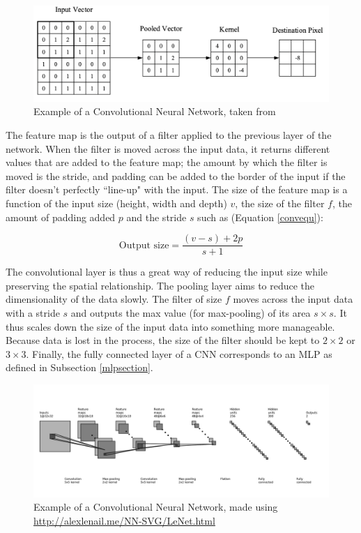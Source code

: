 \begin{figure}[H]
\centering
\includegraphics[scale=0.3]{Figures/conv2D.png}
\caption{Example of a Convolutional Neural Network, taken from \cite{cnnintro}}
\label{conv2D}
\end{figure}


The feature map is the output of a filter applied to the previous layer of the network. When the filter is moved across the input data, it returns different values that are added to the feature map; the amount by which the filter is moved is the stride, and padding can be added to the border of the input if the filter doesn't perfectly ``line-up" with the input. The size of the feature map is a function of the input size (height, width and depth) $v$, the size of the filter $f$, the amount of padding added $p$ and the stride $s$ such as (Equation \ref{convequ}):

\begin{equation}
\label{convequ}
	\text{Output size} = \frac{(v-s)+2p}{s+1}
\end{equation}

The convolutional layer is thus a great way of reducing the input size while preserving the spatial relationship. \newline
The pooling layer aims to reduce the dimensionality of the data slowly. The filter of size $f$ moves across the input data with a stride $s$ and outputs the max value (for max-pooling) of its area $s \times s$. It thus scales down the size of the input data into something more manageable. Because data is lost in the process, the size of the filter should be kept to $2 \times 2$ or $3 \times 3$.\newline
Finally, the fully connected layer of a CNN corresponds to an MLP as defined in Subsection \ref{mlpsection}.

\begin{figure}[H]
\centering
\includegraphics[scale=0.184]{Figures/cnn.png}
\caption{Example of a Convolutional Neural Network, made using \\ \url{http://alexlenail.me/NN-SVG/LeNet.html}}
\label{cnnex}
\end{figure}

